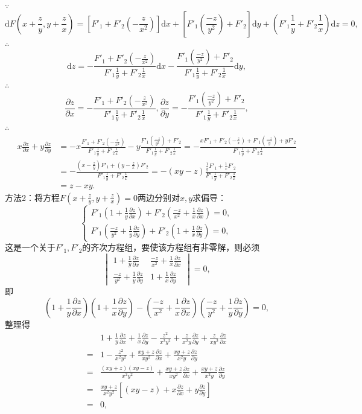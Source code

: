 \documentclass[12pt,UTF8]{ctexart}
\begin{document}
\begin{enumerate}
$\because$
\[
\mathrm dF(x+\frac zy,y+\frac zx)=[F'_1+F'_2(-\frac z{x^2})]\mathrm dx+[F'_1(\frac{-z}{y^2})+F'_2]\mathrm dy+(F'_1\frac1y+F'_2\frac1x)\mathrm dz=0,\]
$\therefore$
\[
\mathrm dz=-\frac{F'_1+F'_2(-\frac z{x^2})}{F'_1\frac1y+F'_2\frac1x}\mathrm dx-\frac{F'_1(\frac{-z}{y^2})+F'_2}{F'_1\frac1y+F'_2\frac1x}\mathrm dy,
\]
$\therefore$
\[
\frac{\partial z}{\partial x}=-\frac{F'_1+F'_2(-\frac z{x^2})}{F'_1\frac1y+F'_2\frac1x},\frac{\partial z}{\partial y}=-\frac{F'_1(\frac{-z}{y^2})+F'_2}{F'_1\frac1y+F'_2\frac1x},
\]
$\therefore$
\[\begin{split}
x\frac{\partial z}{\partial x}+y\frac{\partial z}{\partial y}&=-x\frac{F'_1+F'_2(-\frac z{x^2})}{F'_1\frac1y+F'_2\frac1x}-y\frac{F'_1(\frac{-z}{y^2})+F'_2}{F'_1\frac1y+F'_2\frac1x}=-\frac{xF'_1+F'_2(-\frac zx)+F'_1(\frac{-z}y)+yF'_2}{F'_1\frac1y+F'_2\frac1x}\\
&=-\frac{(x-\frac zy)F'_1+(y-\frac zx)F'_2}{F'_1\frac1y+F'_2\frac1x}=-(xy-z)\frac{\frac1yF'_1+\frac1xF'_2}{F'_1\frac1y+F'_2\frac1x}\\
&=z-xy.
\end{split}\]
方法2：将方程$F(x+\frac zy,y+\frac zx)=0$两边分别对$x,y$求偏导：
\[\begin{cases}
F'_1(1+\frac1y\frac{\partial z}{\partial x})+F'_2(\frac{-z}{x^2}+\frac1x\frac{\partial z}{\partial x})=0,\\
F'_1(\frac{-z}{y^2}+\frac1y\frac{\partial z}{\partial y})+F'_2(1+\frac1x\frac{\partial z}{\partial y})=0,
\end{cases}\]
这是一个关于$F'_1,F'_2$的齐次方程组，要使该方程组有非零解，则必须
\[\begin{vmatrix}
1+\frac1y\frac{\partial z}{\partial x}&\frac{-z}{x^2}+\frac1x\frac{\partial z}{\partial x}\\
\frac{-z}{y^2}+\frac1y\frac{\partial z}{\partial y}&1+\frac1x\frac{\partial z}{\partial y}
\end{vmatrix}=0,
\]
即
\[
(1+\frac1y\frac{\partial z}{\partial x})(1+\frac1x\frac{\partial z}{\partial y})-(\frac{-z}{x^2}+\frac1x\frac{\partial z}{\partial x})(\frac{-z}{y^2}+\frac1y\frac{\partial z}{\partial y})=0,
\]
整理得
\[\begin{split}
&1+\frac1y\frac{\partial z}{\partial x}+\frac1x\frac{\partial z}{\partial y}-\frac{z^2}{x^2y^2}+\frac z{x^2y}\frac{\partial z}{\partial y}+\frac z{xy^2}\frac{\partial z}{\partial x}\\
=&1-\frac{z^2}{x^2y^2}+\frac{xy+z}{xy^2}\frac{\partial z}{\partial x}+\frac{xy+z}{x^2y}\frac{\partial z}{\partial y}\\
=&\frac{(xy+z)(xy-z)}{x^2y^2}+\frac{xy+z}{xy^2}\frac{\partial z}{\partial x}+\frac{xy+z}{x^2y}\frac{\partial z}{\partial y}\\
=&\frac{xy+z}{x^2y^2}[(xy-z)+x\frac{\partial z}{\partial x}+y\frac{\partial z}{\partial y}]\\
=&0,
\end{split}\]


\end{enumerate}
\end{document}
